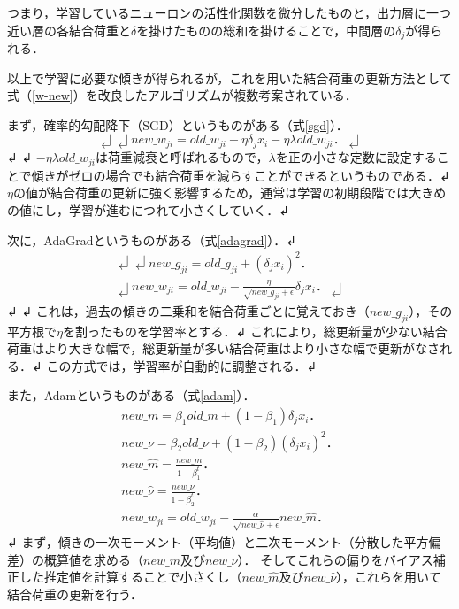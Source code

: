 つまり，学習しているニューロンの活性化関数を微分したものと，出力層に一つ近い層の各結合荷重と$\delta$を掛けたものの総和を掛けることで，中間層の$\delta_j$が得られる．

以上で学習に必要な傾きが得られるが，これを用いた結合荷重の更新方法として式（\ref{w-new}）を改良したアルゴリズムが複数考案されている．

まず，確率的勾配降下（SGD）というものがある（式\ref{sgd}）．
\begin{equation}↲
\label{sgd}↲
new\_w_{ji} = old\_w_{ji} - \eta \delta_j x_i - \eta \lambda old\_w_{ji}．↲
\end{equation}↲
↲
$- \eta \lambda old\_w_{ji}$は荷重減衰と呼ばれるもので，$\lambda$を正の小さな定数に設定することで傾きがゼロの場合でも結合荷重を減らすことができるというものである．↲
$\eta$の値が結合荷重の更新に強く影響するため，通常は学習の初期段階では大きめの値にし，学習が進むにつれて小さくしていく．↲

次に，AdaGrad\cite{3-adagrad}というものがある（式\ref{adagrad}）．↲
\begin{eqnarray}↲
\label{adagrad}↲
new\_g_{ji} = old\_g_{ji} + (\delta_j x_i)^2． \nonumber \\↲
new\_w_{ji} = old\_w_{ji} - \frac{\eta}{\sqrt{new\_g_{ji} + \epsilon}} \delta_j x_i．↲
\end{eqnarray}↲
↲
これは，過去の傾きの二乗和を結合荷重ごとに覚えておき（$new\_g_{ji}$），その平方根で$\eta$を割ったものを学習率とする．↲
これにより，総更新量が少ない結合荷重はより大きな幅で，総更新量が多い結合荷重はより小さな幅で更新がなされる．↲
この方式では，学習率が自動的に調整される\cite{3-adagrad-detail}．↲

また，Adam\cite{3-adam}というものがある（式\ref{adam}）．
\begin{eqnarray}
\label{adam}
new\_m = \beta_1 old\_m + (1 - \beta_1) \delta_j x_i．\nonumber \\
new\_\nu = \beta_2 old\_\nu + (1 - \beta_2) (\delta_j x_i)^2．\nonumber \\
new\_\hat{m} = \frac{new\_m}{1 - \beta^t_1}．\nonumber \\
new\_\hat{\nu} = \frac{new\_\nu}{1 - \beta^t_2}．\nonumber \\
new\_w_{ji} = old\_w_{ji} - \frac{\alpha}{\sqrt{new\_\hat{\nu}} + \epsilon} new\_\hat{m}．
\end{eqnarray}
↲
まず，傾きの一次モーメント（平均値）と二次モーメント（分散した平方偏差）の概算値を求める（$new\_m$及び$new\_\nu$）．
そしてこれらの偏りをバイアス補正した推定値を計算することで小さくし（$new\_\hat{m}$及び$new\_\hat{\nu}$），これらを用いて結合荷重の更新を行う\cite{3-adam-detail}．

